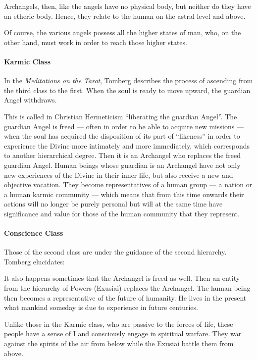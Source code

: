 Archangels, then, like the angels have no physical body, but neither do they have an etheric body. Hence, they relate to
the human on the astral level and above.

Of course, the various angels possess all the higher states of man, who, on the other hand, must work in order to reach
those higher states.

\paragraph{Karmic Class}
In the \emph{Meditations on the Tarot}, Tomberg describes the process of ascending from the third class to the first.
When the soul is ready to move upward, the guardian Angel withdraws.

\begin{quotex}
This is called in Christian Hermeticism “liberating the guardian Angel”. The guardian Angel is freed — often
in order to be able to acquire new missions — when the soul has acquired the disposition of its part of
“likeness” in order to experience the Divine more intimately and more immediately, which corresponds to another
hierarchical degree. Then it is an Archangel who replaces the freed guardian Angel. Human beings whose guardian is an
Archangel have not only new experiences of the Divine in their inner life, but also receive a new and objective
vocation. They become representatives of a human group — a nation or a human karmic community — which means that from this time onwards their actions will no longer be purely personal but will at the same time have
significance and value for those of the human community that they represent. 

\end{quotex}
\paragraph{Conscience Class}
Those of the second class are under the guidance of the second hierarchy. Tomberg elucidates:

\begin{quotex}
It also happens sometimes that the Archangel is freed as well. Then an entity from the hierarchy of Powers (Exusiai)
replaces the Archangel. The human being then becomes a representative of the future of humanity. He lives in the
present what mankind someday is due to experience in future centuries. 

\end{quotex}
Unlike those in the Karmic class, who are passive to the forces of life, these people have a sense of I and consciously
engage in spiritual warfare. They war against the spirits of the air from below while the Exusiai battle them from
above.


